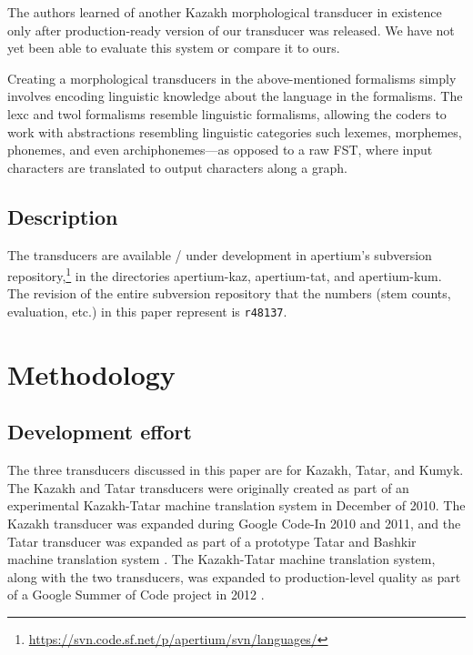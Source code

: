 \documentclass[a4paper,11pt,twocolumn]{article}
\begin{document}
The authors learned of another Kazakh morphological transducer in existence \citep{bekmanova2013} only after production-ready version of our transducer was released.  We have not yet been able to evaluate this system or compare it to ours.

Creating a morphological transducers in the above-mentioned formalisms simply involves encoding linguistic knowledge about the language in the formalisms.  The lexc and twol formalisms resemble linguistic formalisms, allowing the coders to work with abstractions resembling linguistic categories such lexemes, morphemes, phonemes, and even archiphonemes---as opposed to a raw FST, where input characters are translated to output characters along a graph.


\subsection{Description}

The transducers are available / under development in apertium's subversion repository,\footnote{\url{https://svn.code.sf.net/p/apertium/svn/languages/}} in the directories apertium-kaz, apertium-tat, and apertium-kum.  The revision of the entire subversion repository that the numbers (stem counts, evaluation, etc.) in this paper represent is \texttt{r48137}.


\section{Methodology}



\subsection{Development effort}

The three transducers discussed in this paper are for Kazakh, Tatar, and Kumyk.  The Kazakh and Tatar transducers were originally created as part of an experimental Kazakh-Tatar machine translation system in December of 2010.  The Kazakh transducer was expanded during Google Code-In 2010 and 2011, and the Tatar transducer was expanded as part of a prototype Tatar and Bashkir machine translation system \citep{tyerswashingtonsalimzyanbattalov12}.  The Kazakh-Tatar machine translation system, along with the two transducers, was expanded to production-level quality as part of a Google Summer of Code project in 2012 \citep{salimzyanov2013}.
\end{document}

